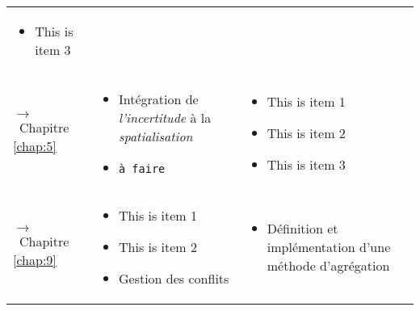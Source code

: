 \begin{tabular}{L{.2\textheight}L{.35\textheight}L{.35\textheight}}
\begin{minipage}{.35\textheight}
\begin{itemize}
    \item This is item 3
    \end{itemize}
  \end{minipage} \\
{\par\footnotesize\hspace{.25cm}$\longrightarrow$~Chapitre
\ref{chap:5}} & \begin{minipage}{.35\textheight}
    \begin{itemize}
    \item Intégration de \emph{l'incertitude} à la \emph{spatialisation}
    \item \texttt{à faire}
    \end{itemize}
  \end{minipage}& \begin{minipage}{.35\textheight}
    \begin{itemize}
    \item This is item 1
    \item This is item 2
    \item This is item 3
    \end{itemize}
  \end{minipage} \\
  
{\par\footnotesize\hspace{.25cm}$\longrightarrow$~Chapitre
\ref{chap:9}} & \begin{minipage}{.35\textheight}
    \begin{itemize}
    \item This is item 1
    \item This is item 2
    \item Gestion des conflits
    \end{itemize}
  \end{minipage}& \begin{minipage}{.35\textheight}
    \begin{itemize}
    \item Définition et implémentation d'une méthode d'agrégation
    \end{itemize}
  \end{minipage} \\
  

\end{tabular}
